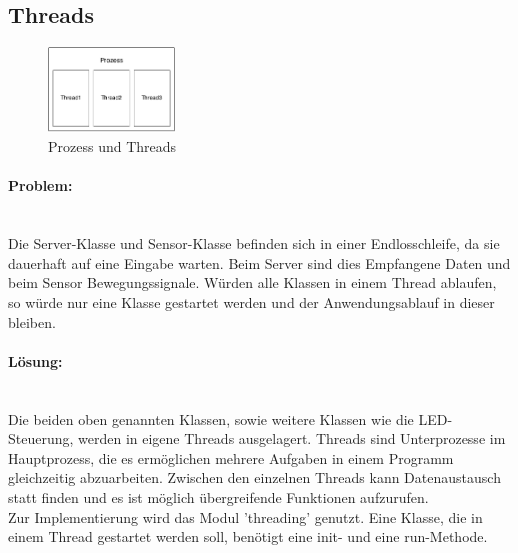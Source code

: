 \subsection{Threads}

\begin{figure}
	\vspace{-20pt}
	\begin{center}
		\includegraphics[width=0.3\textwidth]{./data/Threads.png}
	\end{center}
	\vspace{-20pt}
	\caption{Prozess und Threads}
	\vspace{-10pt}
\end{figure}

\paragraph{Problem:} \\ Die Server-Klasse und Sensor-Klasse befinden sich in einer Endlosschleife, da sie dauerhaft auf eine Eingabe warten. Beim Server sind dies Empfangene Daten und beim Sensor Bewegungssignale. Würden alle Klassen in einem Thread ablaufen, so würde nur eine Klasse gestartet werden und der Anwendungsablauf in dieser bleiben. 
\paragraph{Lösung:} \\ Die beiden oben genannten Klassen, sowie weitere Klassen wie die LED-Steuerung, werden in eigene Threads ausgelagert. Threads sind Unterprozesse im Hauptprozess, die es ermöglichen mehrere Aufgaben in einem Programm gleichzeitig abzuarbeiten. Zwischen den einzelnen Threads kann Datenaustausch statt finden und es ist möglich übergreifende Funktionen aufzurufen. \\
Zur Implementierung wird das Modul 'threading' genutzt. Eine Klasse, die in einem Thread gestartet werden soll, benötigt eine init- und eine run-Methode.
